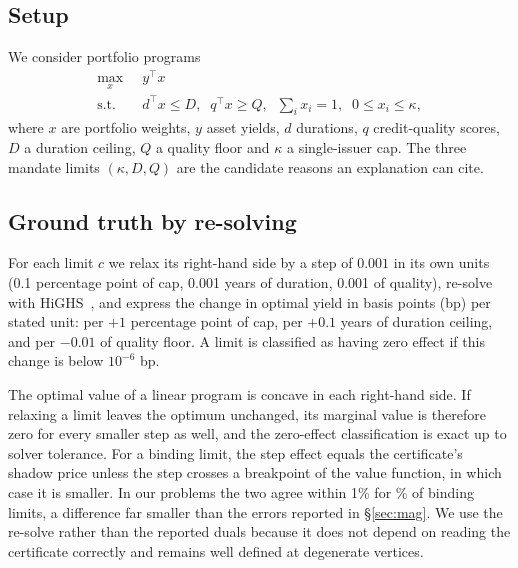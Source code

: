 \subsection{Setup}
We consider portfolio programs
\begin{equation}
\begin{aligned}
\max_{x}\;\; & y^\top x\\
\text{s.t.}\;\; & d^\top x \le D,\;\; q^\top x \ge Q,\;\; \textstyle\sum_i x_i = 1,\;\; 0 \le x_i \le \kappa,
\end{aligned}
\label{eq:lp}
\end{equation}
where $x$ are portfolio weights, $y$ asset yields, $d$ durations, $q$
credit-quality scores, $D$ a duration ceiling, $Q$ a quality floor and $\kappa$ a
single-issuer cap. The three mandate limits $(\kappa, D, Q)$ are the candidate
reasons an explanation can cite.

\subsection{Ground truth by re-solving}
For each limit $c$ we relax its right-hand side by a step of $0.001$ in its own
units (0.1 percentage point of cap, 0.001 years of duration, 0.001 of quality),
re-solve with HiGHS~\cite{huangfu18}, and express the change in optimal yield in
basis points (bp) per stated unit: per $+1$ percentage point of cap, per $+0.1$
years of duration ceiling, and per $-0.01$ of quality floor. A limit is
classified as having zero effect if this change is below $10^{-6}$ bp.

The optimal value of a linear program is concave in each right-hand side. If
relaxing a limit leaves the optimum unchanged, its marginal value is therefore
zero for every smaller step as well, and the zero-effect classification is
exact up to solver tolerance. For a binding limit, the step effect equals the
certificate's shadow price unless the step crosses a breakpoint of the value
function, in which case it is smaller. In our problems the two agree within 1\%
for \compExactOne\% of binding limits, a difference far smaller than the errors
reported in \S\ref{sec:mag}. We use the re-solve rather than the reported duals
because it does not depend on reading the certificate correctly and remains
well defined at degenerate vertices.

